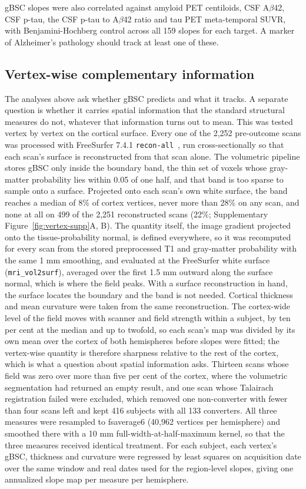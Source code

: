 \documentclass[blue]{ludusofficial}  %
\begin{document}
gBSC slopes were also correlated against amyloid PET centiloids, CSF A$\beta$42, CSF p-tau, the CSF p-tau to A$\beta$42 ratio and tau PET meta-temporal SUVR, with Benjamini-Hochberg control across all 159 slopes for each target. A marker of Alzheimer's pathology should track at least one of these.

\subsection{Vertex-wise complementary information}
\label{sec:vertex-methods}

The analyses above ask whether gBSC predicts and what it tracks. A separate question is whether it carries spatial information that the standard structural measures do not, whatever that information turns out to mean. This was tested vertex by vertex on the cortical surface. Every one of the 2,252 pre-outcome scans was processed with FreeSurfer 7.4.1 \texttt{recon-all}~\cite{fischl2012freesurfer}, run cross-sectionally so that each scan's surface is reconstructed from that scan alone. The volumetric pipeline stores gBSC only inside the boundary band, the thin set of voxels whose gray-matter probability lies within 0.05 of one half, and that band is too sparse to sample onto a surface. Projected onto each scan's own white surface, the band reaches a median of 8\% of cortex vertices, never more than 28\% on any scan, and none at all on 499 of the 2,251 reconstructed scans (22\%; Supplementary Figure~\ref{fig:vertex-supp}A, B). The quantity itself, the image gradient projected onto the tissue-probability normal, is defined everywhere, so it was recomputed for every scan from the stored preprocessed T1 and gray-matter probability with the same 1 mm smoothing, and evaluated at the FreeSurfer white surface (\texttt{mri\_vol2surf}), averaged over the first 1.5 mm outward along the surface normal, which is where the field peaks. With a surface reconstruction in hand, the surface locates the boundary and the band is not needed. Cortical thickness and mean curvature were taken from the same reconstruction. The cortex-wide level of the field moves with scanner and field strength within a subject, by ten per cent at the median and up to twofold, so each scan's map was divided by its own mean over the cortex of both hemispheres before slopes were fitted; the vertex-wise quantity is therefore sharpness relative to the rest of the cortex, which is what a question about spatial information asks. Thirteen scans whose field was zero over more than five per cent of the cortex, where the volumetric segmentation had returned an empty result, and one scan whose Talairach registration failed were excluded, which removed one non-converter with fewer than four scans left and kept 416 subjects with all 133 converters. All three measures were resampled to fsaverage6 (40,962 vertices per hemisphere) and smoothed there with a 10 mm full-width-at-half-maximum kernel, so that the three measures received identical treatment. For each subject, each vertex's gBSC, thickness and curvature were regressed by least squares on acquisition date over the same window and real dates used for the region-level slopes, giving one annualized slope map per measure per hemisphere.
\end{document}
